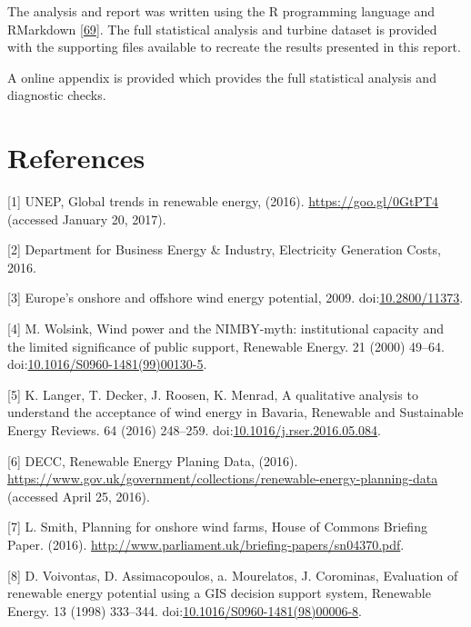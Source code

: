 \documentclass[a4paper,]{article}
\theoremstyle{definition}
\theoremstyle{definition}
\theoremstyle{definition}
\theoremstyle{remark}
\begin{document}
The analysis and report was written using the R programming language and
RMarkdown {[}\protect\hyperlink{ref-R-rmarkdown}{69}{]}. The full
statistical analysis and turbine dataset is provided with the supporting
files available to recreate the results presented in this report.

A online appendix is provided which provides the full statistical
analysis and diagnostic checks.

\section*{References}\label{references}

\hypertarget{refs}{}
\hypertarget{ref-UNEP2016}{}
{[}1{]} UNEP, Global trends in renewable energy, (2016).
\url{https://goo.gl/0GtPT4} (accessed January 20, 2017).

\hypertarget{ref-DBIES2016}{}
{[}2{]} Department for Business Energy \& Industry, Electricity
Generation Costs, 2016.

\hypertarget{ref-EuropeanEnvironmentAgency2009}{}
{[}3{]} Europe's onshore and offshore wind energy potential, 2009.
doi:\href{https://doi.org/10.2800/11373}{10.2800/11373}.

\hypertarget{ref-Wolsink2000}{}
{[}4{]} M. Wolsink, Wind power and the NIMBY-myth: institutional
capacity and the limited significance of public support, Renewable
Energy. 21 (2000) 49--64.
doi:\href{https://doi.org/10.1016/S0960-1481(99)00130-5}{10.1016/S0960-1481(99)00130-5}.

\hypertarget{ref-Langer2016}{}
{[}5{]} K. Langer, T. Decker, J. Roosen, K. Menrad, A qualitative
analysis to understand the acceptance of wind energy in Bavaria,
Renewable and Sustainable Energy Reviews. 64 (2016) 248--259.
doi:\href{https://doi.org/10.1016/j.rser.2016.05.084}{10.1016/j.rser.2016.05.084}.

\hypertarget{ref-DECC2016}{}
{[}6{]} DECC, Renewable Energy Planing Data, (2016).
\url{https://www.gov.uk/government/collections/renewable-energy-planning-data}
(accessed April 25, 2016).

\hypertarget{ref-Smith2016}{}
{[}7{]} L. Smith, Planning for onshore wind farms, House of Commons
Briefing Paper. (2016).
\url{http://www.parliament.uk/briefing-papers/sn04370.pdf}.

\hypertarget{ref-Voivontas1998}{}
{[}8{]} D. Voivontas, D. Assimacopoulos, a. Mourelatos, J. Corominas,
Evaluation of renewable energy potential using a GIS decision support
system, Renewable Energy. 13 (1998) 333--344.
doi:\href{https://doi.org/10.1016/S0960-1481(98)00006-8}{10.1016/S0960-1481(98)00006-8}.
\end{document}
